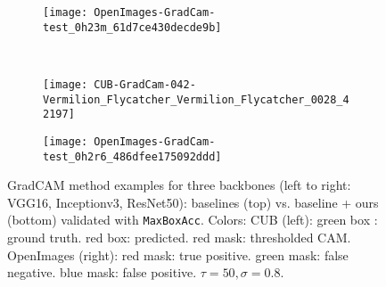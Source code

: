 \documentclass[twocolumn]{article}
\newcommand\maxboxacc{\texttt{MaxBoxAcc}\xspace}
\theoremstyle{definition}
\begin{document}
\begin{figure*}
\begin{subfigure}[b]{0.49\textwidth}
     \end{subfigure}
     \hfill
     \begin{subfigure}[b]{0.49\textwidth}
         \centering
         \texttt{[image: OpenImages-GradCam-test\_0h23m\_61d7ce430decde9b]}
     \end{subfigure}
     \\
     \vspace{0.1cm}
     \begin{subfigure}[b]{0.49\textwidth}
         \centering
         \texttt{[image: CUB-GradCam-042-Vermilion\_Flycatcher\_Vermilion\_Flycatcher\_0028\_42197]}
     \end{subfigure}
     \hfill
     \begin{subfigure}[b]{0.49\textwidth}
         \centering
         \texttt{[image: OpenImages-GradCam-test\_0h2r6\_486dfee175092ddd]}
     \end{subfigure}
        \caption{GradCAM method examples for three backbones (left to right: VGG16, Inceptionv3, ResNet50): baselines (top) vs. baseline + ours (bottom)  validated with \maxboxacc. Colors: CUB (left): green box : ground truth. red box: predicted. red mask: thresholded CAM. OpenImages (right): red mask: true positive. green mask: false negative. blue mask: false positive. ${\tau=50, \sigma=0.8}$.}
        \label{fig:gradcam-cub-openim-example-pred}
\end{figure*}
\end{document}
